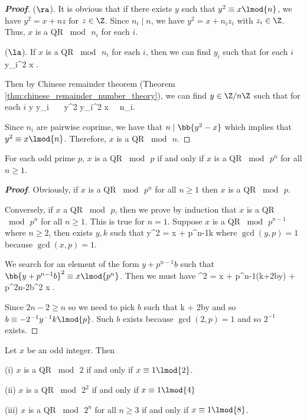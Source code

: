\begin{proof}[\bf Proof]
($\ra$). It is obvious that if there exists $y$ such that $y^2 \equiv x \lmod{n}$, we have $y^2 = x+ nz$ for $z\in \Z$. Since $n_i \mid n$, we have $y^2 = x + n_i z_i$ with $z_i\in \Z$. Thus, $x$ is a QR $\bmod\, n_i$ for each $i$. 

($\la$). If $x$ is a QR $\bmod\, n_i$ for each $i$, then we can find $y_i$ such that for each $i$
\be
y_i^2 \equiv x .
\ee

Then by Chinese remainder theorem (Theorem \ref{thm:chinese_remainder_number_theory}), we can find $y\in \Z/n\Z$ such that for each $i$
\be
y \equiv y_i  \ \ra\ \ y^2 \equiv y_i^2 \equiv x \ \ra\ n_i\mid {}. 
\ee

Since $n_i$ are pairwise coprime, we have that $n\mid \bb{y^2 -x}$ which implies that $y^2 \equiv x\lmod{n}$. Therefore, $x$ is a QR $\bmod\, n$. 
\end{proof}

\begin{theorem}\label{thm:hensel_lemma_number_theory}
For each odd prime $p$, $x$ is a QR $\bmod \, p$ if and only if $x$ is a QR $\bmod\, p^n$ for all $n\geq 1$. 
\end{theorem}

\begin{proof}[\bf Proof]
Obviously, if $x$ is a QR $\bmod\, p^n$ for all $n\geq 1$ then $x$ is a QR $\bmod\, p$. 

Conversely, if $x$ a QR $\bmod\, p$, then we prove by induction that $x$ is a QR $\bmod\, p^n$ for all $n\geq 1$. This is true for $n=1$. Suppose $x$ is a QR $\bmod\, p^{n-1}$ where $n\geq 2$, then exists $y,k$ such that
\be
y^2 =  x + p^{n-1}k
\ee
where $\gcd(y,p)=1$ because $\gcd(x,p)=1$. 

We search for an element of the form $y + p^{n-1}b$ such that $\bb{y + p^{n-1}b}^2 \equiv x \lmod{p^n}$. Then we must have
\be
{}^2 = x + p^{n-1}(k+2by) + p^{2n-2}b^2 \equiv x .
\ee

Since $2n-2\geq n$ so we need to pick $b$ such that 
\be
k + 2by  
\ee
and so $b \equiv - 2^{-1}y^{-1}k \lmod{p}$. Such $b$ exists because $\gcd(2,p)=1$ and so $2^{-1}$ exists.
\end{proof}

\begin{theorem}\label{thm:qr_mod_power_of_2_iff_2}
Let $x$ be an odd integer. Then 
\ben
\item [(i)] $x$ is a QR $\bmod\, 2$ if and only if $x\equiv 1\lmod{2}$.
\item [(ii)] $x$ is a QR $\bmod\, 2^2$ if and only if $x\equiv 1\lmod{4}$
\item [(iii)] $x$ is a QR $\bmod\, 2^n$ for all $n\geq 3$ if and only if $x\equiv 1\lmod{8}$.
\een
\end{theorem}


